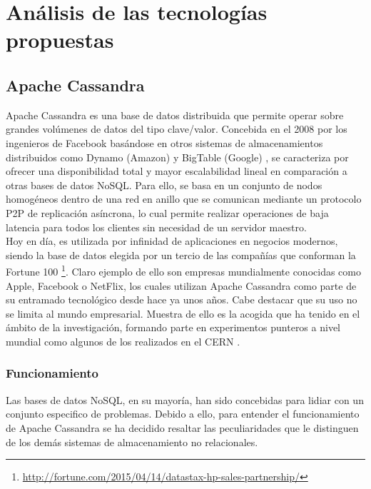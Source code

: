 
\pagestyle{fancy}

\chapter{Análisis de las tecnologías propuestas}
\label{analisis_tecnologias}

\section{Apache Cassandra}

Apache Cassandra es una base de datos distribuida que permite operar sobre grandes volúmenes de datos del tipo clave/valor. Concebida en el 2008 por los ingenieros de Facebook basándose en otros sistemas de almacenamientos distribuidos como Dynamo (Amazon) \cite{decandia2007dynamo} y BigTable (Google) \cite{chang2008bigtable}, se caracteriza por ofrecer una  disponibilidad total y mayor escalabilidad lineal en comparación a otras bases de datos NoSQL.  Para ello, se basa en un conjunto de nodos homogéneos dentro de una red en anillo que se comunican mediante un protocolo P2P de replicación asíncrona, lo cual permite realizar operaciones de baja latencia para todos los clientes sin necesidad de un servidor maestro.\\

Hoy en día, es utilizada por infinidad de aplicaciones en negocios modernos, siendo la base de datos elegida por un tercio de las compañías que conforman la Fortune 100 \footnote{\url{http://fortune.com/2015/04/14/datastax-hp-sales-partnership/}}. Claro ejemplo de ello son empresas mundialmente conocidas como Apple, Facebook o NetFlix, los cuales utilizan Apache Cassandra como parte de su entramado tecnológico desde hace ya unos años. Cabe destacar que su uso no se limita al mundo empresarial. Muestra de ello es la acogida que ha tenido en el ámbito de la investigación, formando parte en experimentos punteros a nivel mundial como algunos de los realizados en el CERN \cite{sicoe2012persistent}.\\

\subsection{Funcionamiento}

Las bases de datos NoSQL, en su mayoría, han sido concebidas para lidiar con un conjunto especifico de problemas. Debido a ello, para entender el funcionamiento de Apache Cassandra se ha decidido resaltar las peculiaridades que le distinguen de los demás sistemas de almacenamiento no relacionales.

